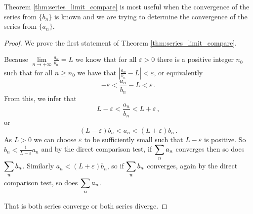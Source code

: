 	\checkoddpage
{}

Theorem \ref{thm:series_limit_compare} is most useful when the convergence of the series from $\{b_n\}$ is known and we are trying to determine the convergence of the series from $\{a_n\}$. 

\ifanalysis

\begin{proof}
We prove the first statement of Theorem \ref{thm:series_limit_compare}.

Because $ \lim\limits _{n\to+\infty }{\frac {a_{n}}{b_{n}}}=L$  we know that for all $\varepsilon >0$ there is a positive integer $n_{0}$ such that for all $n\geq n_{0}$ we have that $\left|{\frac {a_{n}}{b_{n}}}-L\right|<\varepsilon$, or equivalently
$$
\displaystyle -\varepsilon <{\frac {a_{n}}{b_{n}}}-L<\varepsilon\,.
$$
From this, we infer that
$$
\displaystyle L-\varepsilon <{\frac {a_{n}}{b_{n}}}<L+\varepsilon \,,
$$
or
$$
\displaystyle (L-\varepsilon )b_{n}<a_{n}<(L+\varepsilon )b_{n}\,.
$$
As $L>0$ we can choose $\varepsilon$ to be sufficiently small such that $L-\varepsilon$  is positive. So $ b_{n}<{\frac {1}{L-\varepsilon }}a_{n}$ and by the direct comparison test, if $\displaystyle \sum _{n}a_{n}$ converges then so does $\displaystyle \sum _{n}b_{n}$. Similarly $a_{n}<(L+\varepsilon )b_{n}$, so if $\displaystyle \sum _{n}b_{n}$ converges, again by the direct comparison test, so does $\displaystyle \sum _{n}a_{n}$.

That is both series converge or both series diverge. 
\end{proof}

\fi

